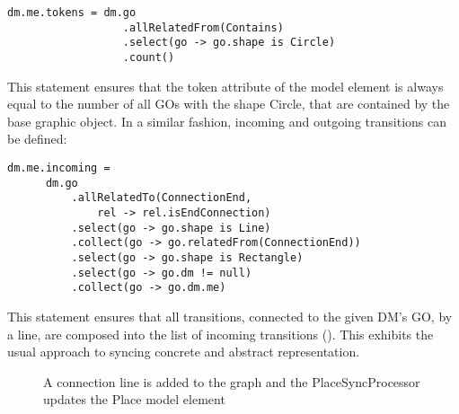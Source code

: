 \begin{lstlisting}[captionpos=b,caption={Rule that syncs the token count of a place element}]
dm.me.tokens = dm.go
                  .allRelatedFrom(Contains)
                  .select(go -> go.shape is Circle)
                  .count()
\end{lstlisting}

This statement ensures that the token attribute of the model element is always equal to the number of all GOs with the shape Circle, that are contained by the base graphic object. In a similar fashion, incoming and outgoing transitions can be defined:
\begin{lstlisting}[captionpos=b,caption={Rule that syncs incoming transitions of a place element},label={lst:incoming-transitions}]
dm.me.incoming = 
      dm.go
          .allRelatedTo(ConnectionEnd,
              rel -> rel.isEndConnection)
          .select(go -> go.shape is Line)
          .collect(go -> go.relatedFrom(ConnectionEnd))
          .select(go -> go.shape is Rectangle)
          .select(go -> go.dm != null)
          .collect(go -> go.dm.me)
\end{lstlisting}

This statement ensures that all transitions, connected to the given DM's GO, by a line, are composed into the list of incoming transitions (). This exhibits the usual approach to syncing concrete and abstract representation.


\begin{figure}[h]
  \centering
  
  \caption{A connection line is added to the graph and the PlaceSyncProcessor updates the Place model element}
  \label{fig:incoming-sync}
\end{figure}


